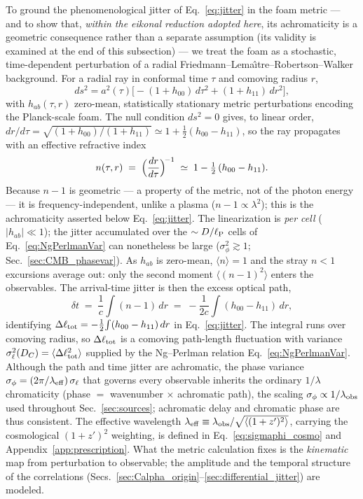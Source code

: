 \documentclass[aps,prd,onecolumn,amsmath,amssymb]{revtex4-2}
\begin{document}
To ground the phenomenological jitter of Eq.~\eqref{eq:jitter} in the
foam metric --- and to show that, \emph{within the eikonal reduction
adopted here}, its achromaticity is a geometric consequence rather than a
separate assumption (its validity is examined at the end of this
subsection) --- we treat the foam as a
stochastic, time-dependent perturbation of a radial
Friedmann--Lema\^{\i}tre--Robertson--Walker background.  For a radial ray
in conformal time $\tau$ and comoving radius $r$,
\begin{equation}
  ds^2 = a^2(\tau)\bigl[-(1+h_{00})\,d\tau^2 + (1+h_{11})\,dr^2\bigr],
  \label{eq:foam_metric}
\end{equation}
with $h_{ab}(\tau,r)$ zero-mean, statistically stationary metric
perturbations encoding the Planck-scale foam.  The null condition
$ds^2=0$ gives, to linear order,
$dr/d\tau=\sqrt{(1+h_{00})/(1+h_{11})}\simeq 1+\tfrac12(h_{00}-h_{11})$,
so the ray propagates with an effective refractive index
\begin{equation}
  n(\tau,r) \;=\; \Bigl(\frac{dr}{d\tau}\Bigr)^{\!-1}
  \;\simeq\; 1 - \tfrac12\,(h_{00}-h_{11}).
  \label{eq:foam_index}
\end{equation}
Because $n-1$ is geometric --- a property of the metric, not of the
photon energy --- it is frequency-independent, unlike a plasma
($n-1\propto\lambda^2$); this is the achromaticity asserted below
Eq.~\eqref{eq:jitter}.  The linearization is \emph{per cell}
($|h_{ab}|\ll1$); the jitter accumulated over the $\sim D/\ell_{\rm P}$
cells of Eq.~\eqref{eq:NgPerlmanVar} can nonetheless be large
($\sigma_\phi^2\gtrsim1$; Sec.~\ref{sec:CMB_phasevar}).  As $h_{ab}$ is
zero-mean, $\langle n\rangle=1$ and the stray $n<1$ excursions average
out: only the second moment $\langle(n-1)^2\rangle$ enters the
observables.  The arrival-time jitter is then the excess
optical path,
\begin{equation}
  \delta t \;=\; \frac1c\!\int (n-1)\,dr
           \;=\; -\frac{1}{2c}\!\int (h_{00}-h_{11})\,dr,
  \label{eq:dt_metric}
\end{equation}
identifying $\Delta\ell_{\rm tot}=-\tfrac12\!\int(h_{00}-h_{11})\,dr$ in
Eq.~\eqref{eq:jitter}.  The integral runs over comoving radius, so
$\Delta\ell_{\rm tot}$ is a comoving path-length fluctuation with variance
$\sigma_\ell^2(D_C)=\langle\Delta\ell_{\rm tot}^2\rangle$ supplied by the
Ng--Perlman relation Eq.~\eqref{eq:NgPerlmanVar}.  Although the path
and time jitter are achromatic, the phase variance
$\sigma_\phi=(2\pi/\lambda_{\rm eff})\,\sigma_\ell$ that governs every observable
inherits the ordinary $1/\lambda$ chromaticity (phase $=$
wavenumber $\times$ achromatic path), the scaling $\sigma_\phi\propto1/\lambda_{\rm obs}$ used
throughout Sec.~\ref{sec:sources}; achromatic delay and chromatic phase
are thus consistent.  The effective wavelength
$\lambda_{\rm eff}\equiv\lambda_{\rm obs}/\sqrt{\langle(1+z')^2\rangle}$, carrying
the cosmological $(1+z')^2$ weighting, is defined in
Eq.~\eqref{eq:sigmaphi_cosmo} and Appendix~\ref{app:prescription}.  What the metric calculation fixes is the
\emph{kinematic} map from perturbation to observable; the amplitude and
the temporal structure of the correlations
(Secs.~\ref{sec:Calpha_origin}--\ref{sec:differential_jitter}) are
modeled.
\end{document}
